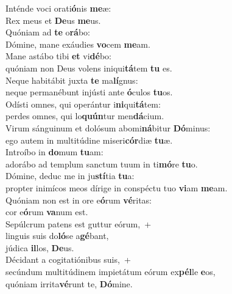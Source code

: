 \evenverse Inténde voci orati\textbf{ó}nis \textbf{me}æ:~\*\\
\evenverse Rex meus et \textbf{De}us \textbf{me}us.\\
\oddverse Quóniam ad \textbf{te} o\textbf{rá}bo:~\*\\
\oddverse Dómine, mane exáudies \textbf{vo}cem \textbf{me}am.\\
\evenverse Mane astábo tibi \textbf{et} vi\textbf{dé}bo:~\*\\
\evenverse quóniam non Deus volens iniqui\textbf{tá}tem \textbf{tu} es.\\
\oddverse Neque habitábit juxta \textbf{te} ma\textbf{lí}gnus:~\*\\
\oddverse neque permanébunt injústi ante \textbf{ó}culos \textbf{tu}os.\\
\evenverse Odísti omnes, qui operántur i\textbf{ni}qui\textbf{tá}tem:~\*\\
\evenverse perdes omnes, qui lo\textbf{quún}tur men\textbf{dá}cium.\\
\oddverse Virum sánguinum et dolósum abomi\textbf{ná}bitur \textbf{Dó}minus:~\*\\
\oddverse ego autem in multitúdine miseri\textbf{cór}diæ \textbf{tu}æ.\\
\evenverse Introíbo in \textbf{do}mum \textbf{tu}am:~\*\\
\evenverse adorábo ad templum sanctum tuum in ti\textbf{mó}re \textbf{tu}o.\\
\oddverse Dómine, deduc me in ju\textbf{stí}tia \textbf{tu}a:~\*\\
\oddverse propter inimícos meos dírige in conspéctu tuo \textbf{vi}am \textbf{me}am.\\
\evenverse Quóniam non est in ore e\textbf{ó}rum \textbf{vé}ritas:~\*\\
\evenverse cor e\textbf{ó}rum \textbf{va}num est.\\
\oddverse Sepúlcrum patens est guttur eórum,~+\\
\oddverse  linguis suis do\textbf{ló}se a\textbf{gé}bant,~\*\\
\oddverse júdica \textbf{il}los, \textbf{De}us.\\
\evenverse Décidant a cogitatiónibus suis,~+\\
\evenverse  secúndum multitúdinem impietátum eórum ex\textbf{pél}le \textbf{e}os,~\*\\
\evenverse quóniam irrita\textbf{vé}runt te, \textbf{Dó}mine.\\
